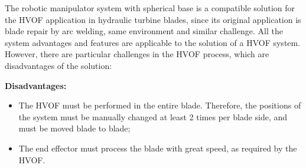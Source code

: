 The robotic manipulator system with spherical base is a compatible solution
for the HVOF application in hydraulic turbine blades, since its
original application is blade repair by arc welding, same environment and
similar challenge. All the system advantages and features are applicable to
the solution of a HVOF system. However, there are particular challenges in the
HVOF process, which are disadvantages of the solution:



\textbf{Disadvantages:}
\begin{itemize}
   \item The HVOF must be performed in the entire blade. Therefore, the
   positions of the system must be manually changed at least 2 times per blade
   side, and must be moved blade to blade;
   \item The end effector must process the blade with great speed, as
   required by the HVOF.
\end{itemize}

